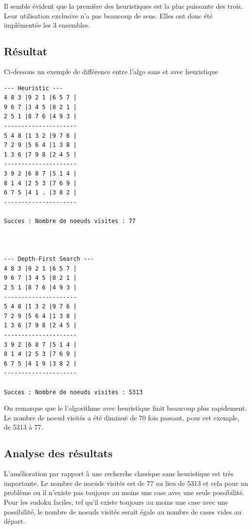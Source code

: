 \documentclass[a4paper,10pt]{article}
\begin{document}
Il semble évident que la première des heuristiques est la plus puissante des trois. Leur utilisation exclusive n'a pas beaucoup de sens. Elles ont donc été implémentée les 3 ensembles.

\subsection{Résultat}

Ci-dessous un exemple de différence entre l'algo sans et avec heuristique
\begin{verbatim}
--- Heuristic ---
4 8 3 |9 2 1 |6 5 7 |
9 6 7 |3 4 5 |8 2 1 |
2 5 1 |8 7 6 |4 9 3 |
---------------------
5 4 8 |1 3 2 |9 7 6 |
7 2 9 |5 6 4 |1 3 8 |
1 3 6 |7 9 8 |2 4 5 |
---------------------
3 9 2 |6 8 7 |5 1 4 |
8 1 4 |2 5 3 |7 6 9 |
6 7 5 |4 1 . |3 8 2 |
---------------------

Succes : Nombre de noeuds visites : 77



--- Depth-First Search ---
4 8 3 |9 2 1 |6 5 7 |
9 6 7 |3 4 5 |8 2 1 |
2 5 1 |8 7 6 |4 9 3 |
---------------------
5 4 8 |1 3 2 |9 7 6 |
7 2 9 |5 6 4 |1 3 8 |
1 3 6 |7 9 8 |2 4 5 |
---------------------
3 9 2 |6 8 7 |5 1 4 |
8 1 4 |2 5 3 |7 6 9 |
6 7 5 |4 1 9 |3 8 2 |
---------------------

Succes : Nombre de noeuds visites : 5313
\end{verbatim}
On remarque que le l'algorithme avec heuristique finit beaucoup plus rapidement. Le nombre de noeud visités a été diminué de 70 fois passant, pour cet exemple, de 5313 à 77.

\subsection{Analyse des résultats}

L'amélioration par rapport à une recherche classique sans heuristique est très importante. Le nombre de noeuds visités est de 77 au lieu de 5313 et cela pour un problème ou il n'existe pas toujours au moins une case avec une seule possibilité.\\

Pour les sudoku faciles, tel qu'il existe toujours au moins une case avec une possibilité, le nombre de noeuds visités serait égale au nombre de cases vides au départ.

\end{document}
